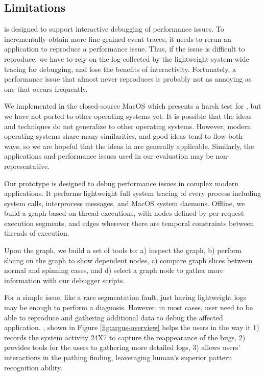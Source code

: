 \subsection{Limitations}

\xxx is designed to support interactive debugging of performance issues.
To incrementally obtain more fine-grained event traces, it needs to rerun
an application to reproduce a performance issue.  Thus, if the issue is
difficult to reproduce, we have to rely on the log collected by the
lightweight system-wide tracing for debugging, and lose the benefits of
interactivity.  Fortunately, a performance issue that almost never
reproduces is probably not as annoying as one that occurs frequently.

We implemented \xxx in the closed-source MacOS which presents a harsh test
for \xxx, but we have not ported \xxx to other operating systems yet.  It
is possible that the ideas and techniques do not generalize to other
operating systems.  However, modern operating systems share many
similarities, and good ideas tend to flow both ways, so we are hopeful
that the ideas in \xxx are generally applicable.  Similarly, the
applications and performance issues used in our evaluation may be
non-representative.

\iffalse

Our \xxx prototype is designed to debug performance issues in complex modern applications.
It performs lightweight full system tracing of every process including system calls,
interprocess messages, and MacOS system daemons.
Offline, we build a graph based on thread executions, with nodes defined by
per-request execution segments,
and edges wherever there are temporal constraints between threads of execution.

Upon the graph, we build a set of tools to:
a) inspect the graph,
b) perform slicing on the graph to show dependent nodes,
c) compare graph slices between normal and spinning cases, and
d) select a graph node to gather more information with our debugger scripts.

For a simple issue, like a rare segmentation fault,
just having lightweight logs may be enough to perform a diagnosis.
However, in most cases, user need to be able to reproduce and gathering
additional data to debug the affected application.
\xxx, shown in Figure \ref{fig:argus-overview} helps the users in the way
it 1) records the system activity 24X7 to capture the reappearance of the bugs,
2) provides tools for the users to gathering more detailed logs,
3) allows users' interactions in the pathing finding,
leaveraging human's superior pattern recognition ability.

